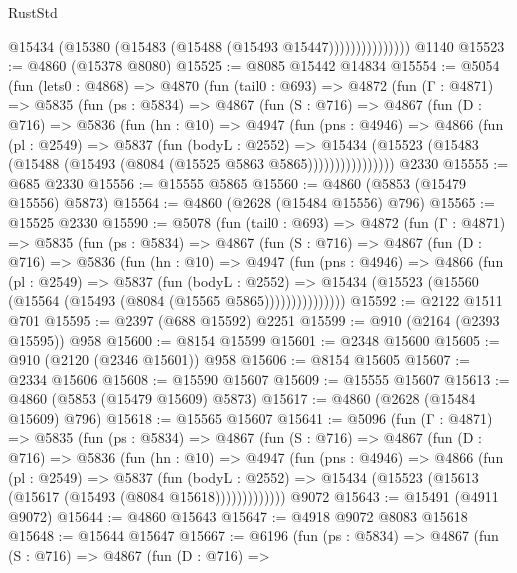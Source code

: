 \begin{lexlean}{RustStd}
\begin{coremodule}
                        @15434 (@15380 (@15483 (@15488 (@15493 @15447)))))))))))))))
    @1140
@15523 := @4860 (@15378 @8080)
@15525 := @8085 @15442 @14834
@15554 := @5054
    (fun (lets0 : @4868) =>
    @4870
      (fun (tail0 : @693) =>
      @4872
        (fun (Γ : @4871) =>
        @5835
          (fun (ps : @5834) =>
          @4867
            (fun (S : @716) =>
            @4867
              (fun (D : @716) =>
              @5836
                (fun (hn : @10) =>
                @4947
                  (fun (pns : @4946) =>
                  @4866
                    (fun (pl : @2549) =>
                    @5837
                      (fun (bodyL : @2552) =>
                      @15434
                        (@15523 (@15483 (@15488 (@15493 (@8084 (@15525 @5863 @5865))))))))))))))))
    @2330
@15555 := @685 @2330
@15556 := @15555 @5865
@15560 := @4860 (@5853 (@15479 @15556) @5873)
@15564 := @4860 (@2628 (@15484 @15556) @796)
@15565 := @15525 @2330
@15590 := @5078
    (fun (tail0 : @693) =>
    @4872
      (fun (Γ : @4871) =>
      @5835
        (fun (ps : @5834) =>
        @4867
          (fun (S : @716) =>
          @4867
            (fun (D : @716) =>
            @5836
              (fun (hn : @10) =>
              @4947
                (fun (pns : @4946) =>
                @4866
                  (fun (pl : @2549) =>
                  @5837
                    (fun (bodyL : @2552) =>
                    @15434 (@15523 (@15560 (@15564 (@15493 (@8084 (@15565 @5865)))))))))))))))
@15592 := @2122 @1511 @701
@15595 := @2397 (@688 @15592) @2251
@15599 := @910 (@2164 (@2393 @15595)) @958
@15600 := @8154 @15599
@15601 := @2348 @15600
@15605 := @910 (@2120 (@2346 @15601)) @958
@15606 := @8154 @15605
@15607 := @2334 @15606
@15608 := @15590 @15607
@15609 := @15555 @15607
@15613 := @4860 (@5853 (@15479 @15609) @5873)
@15617 := @4860 (@2628 (@15484 @15609) @796)
@15618 := @15565 @15607
@15641 := @5096
    (fun (Γ : @4871) =>
    @5835
      (fun (ps : @5834) =>
      @4867
        (fun (S : @716) =>
        @4867
          (fun (D : @716) =>
          @5836
            (fun (hn : @10) =>
            @4947
              (fun (pns : @4946) =>
              @4866
                (fun (pl : @2549) =>
                @5837
                  (fun (bodyL : @2552) =>
                  @15434 (@15523 (@15613 (@15617 (@15493 (@8084 @15618)))))))))))))
    @9072
@15643 := @15491 (@4911 @9072)
@15644 := @4860 @15643
@15647 := @4918 @9072 @8083 @15618
@15648 := @15644 @15647
@15667 := @6196
    (fun (ps : @5834) =>
    @4867
      (fun (S : @716) =>
      @4867
        (fun (D : @716) =>

\end{coremodule}
\end{lexlean}

